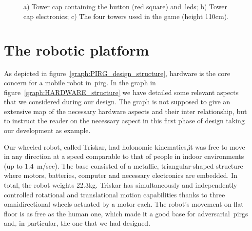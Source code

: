 \begin{figure}[h]
  \centering
  \begin{subfigure}[b]{0.3\textwidth}
  	\centering
	\caption{}
	\label{fig:tower_cap_top}
  \end{subfigure}
  ~ 
  \begin{subfigure}[b]{0.3\textwidth}
  	\centering
	\caption{}
	\label{fig:tower_electronics}
  \end{subfigure}
  ~
   \begin{subfigure}[b]{0.3\textwidth}
	  \centering
      \caption{}
    \end{subfigure}
  \caption{a) Tower cap containing the button (red square) and~\glspl{led}; b) Tower cap electronics; c) The four towers used in the game (height 110cm).}
  \label{fig:towers}
\end{figure}

\section{The robotic platform}\label{sec:roboplat} 
As depicted in figure~\ref{graph:PIRG_design_structure}, hardware is the core concern for a mobile robot in~\gls{pirg}. In the graph in figure~\ref{graph:HARDWARE_structure} we have detailed some relevant aspects that we considered during our design. The graph is not supposed to give an extensive map of the necessary hardware aspects and their inter relationship, but to instruct the reader on the necessary aspect in this first phase of design taking our development as example. %

Our wheeled robot, called Triskar, had holonomic kinematics,\ie it was free to move in any direction at a speed comparable to that of people in indoor environments (up to 1.4~m/sec). The base consisted of a metallic, triangular-shaped structure where motors, batteries, computer and necessary electronics are embedded. In total, the robot weights 22.3kg. Triskar has simultaneously and independently controlled rotational and translational motion capabilities thanks to three omnidirectional wheels actuated by a motor each. The robot's movement on flat floor is as free as the human one, which made it a good base for adversarial~\glspl{pirg} and, in particular, the one that we had designed. 

